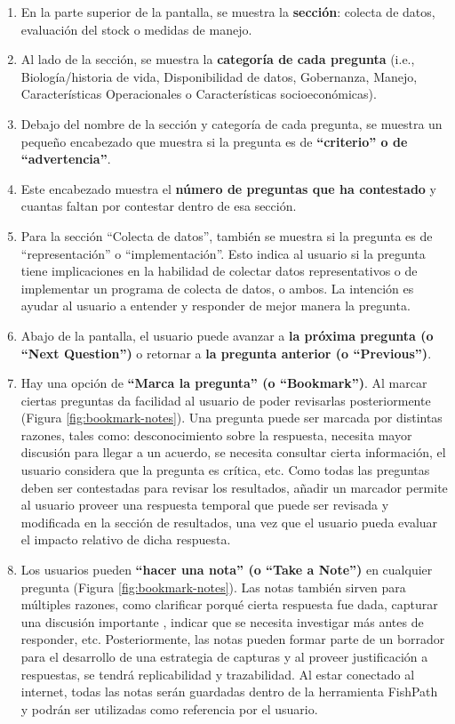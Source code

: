 \documentclass[
  11pt,
]{book}
\providecommand{\tightlist}{%
  \setlength{\itemsep}{0pt}\setlength{\parskip}{0pt}}
\begin{document}
\begin{enumerate}
\def\labelenumi{\arabic{enumi}.}
\tightlist
\item
  En la parte superior de la pantalla, se muestra la \textbf{sección}: colecta de datos, evaluación del stock o medidas de manejo.
\item
  Al lado de la sección, se muestra la \textbf{categoría de cada pregunta} (i.e., Biología/historia de vida, Disponibilidad de datos, Gobernanza, Manejo, Características Operacionales o Características socioeconómicas).
\item
  Debajo del nombre de la sección y categoría de cada pregunta, se muestra un pequeño encabezado que muestra si la pregunta es de \textbf{``criterio'' o de ``advertencia''}.
\item
  Este encabezado muestra el \textbf{número de preguntas que ha contestado} y cuantas faltan por contestar dentro de esa sección.
\item
  Para la sección ``Colecta de datos'', también se muestra si la pregunta es de ``representación'' o ``implementación''. Esto indica al usuario si la pregunta tiene implicaciones en la habilidad de colectar datos representativos o de implementar un programa de colecta de datos, o ambos. La intención es ayudar al usuario a entender y responder de mejor manera la pregunta.
\item
  Abajo de la pantalla, el usuario puede avanzar a \textbf{la próxima pregunta (o ``Next Question'')} o retornar a \textbf{la pregunta anterior (o ``Previous'')}.
\item
  Hay una opción de \textbf{``Marca la pregunta'' (o ``Bookmark'')}. Al marcar ciertas preguntas da facilidad al usuario de poder revisarlas posteriormente (Figura \ref{fig:bookmark-notes}). Una pregunta puede ser marcada por distintas razones, tales como: desconocimiento sobre la respuesta, necesita mayor discusión para llegar a un acuerdo, se necesita consultar cierta información, el usuario considera que la pregunta es crítica, etc. Como todas las preguntas deben ser contestadas para revisar los resultados, añadir un marcador permite al usuario proveer una respuesta temporal que puede ser revisada y modificada en la sección de resultados, una vez que el usuario pueda evaluar el impacto relativo de dicha respuesta.
\item
  Los usuarios pueden \textbf{``hacer una nota'' (o ``Take a Note'')} en cualquier pregunta (Figura \ref{fig:bookmark-notes}). Las notas también sirven para múltiples razones, como clarificar porqué cierta respuesta fue dada, capturar una discusión importante , indicar que se necesita investigar más antes de responder, etc. Posteriormente, las notas pueden formar parte de un borrador para el desarrollo de una estrategia de capturas y al proveer justificación a respuestas, se tendrá replicabilidad y trazabilidad. Al estar conectado al internet, todas las notas serán guardadas dentro de la herramienta FishPath y podrán ser utilizadas como referencia por el usuario.
\end{enumerate}
\end{document}
